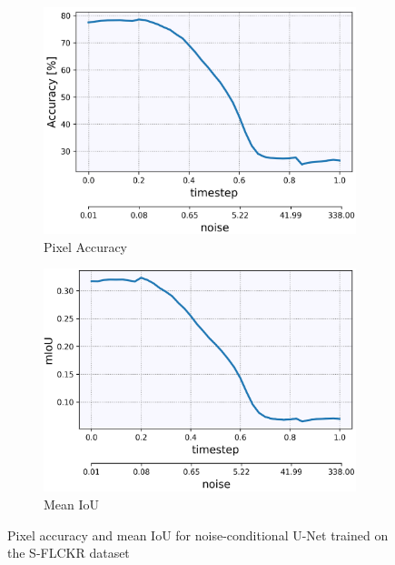 %
%
\begin{figure}[]
    \centering
    \begin{subfigure}[b]{0.49\textwidth}
        \centering
         \includegraphics[width=\textwidth]{Chapters/figures/experiments/flickr/flickr_acc.PNG}
         \caption{Pixel Accuracy}
    \end{subfigure}
    \begin{subfigure}[b]{0.49\textwidth}
        \centering
         \includegraphics[width=\textwidth]{Chapters/figures/experiments/flickr/flickr_mIoU.PNG}
         \caption{Mean IoU}
    \end{subfigure}
    \caption[Pixel accuracy and mIoU for U-Net on S-FLCKR dataset]{Pixel accuracy and mean IoU for noise-conditional U-Net trained on the S-FLCKR dataset}
\end{figure}
%
